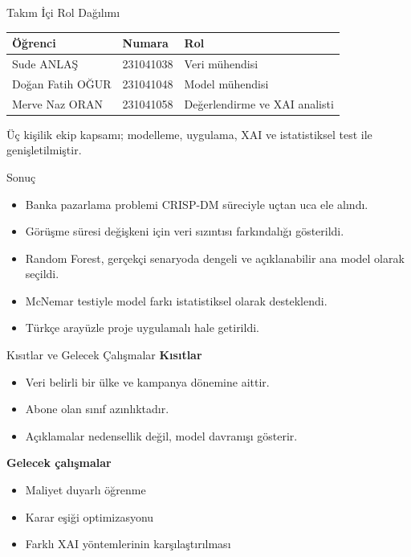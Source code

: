 \documentclass[aspectratio=169]{beamer}
\begin{document}
\begin{frame}{Takım İçi Rol Dağılımı}
    \centering
    \small
    \begin{tabular}{lll}
        \toprule
        \textbf{Öğrenci} & \textbf{Numara} & \textbf{Rol} \\
        \midrule
        Sude ANLAŞ & 231041038 & Veri mühendisi \\
        Doğan Fatih OĞUR & 231041048 & Model mühendisi \\
        Merve Naz ORAN & 231041058 & Değerlendirme ve XAI analisti \\
        \bottomrule
    \end{tabular}

    \vspace{0.35cm}
    \small Üç kişilik ekip kapsamı; modelleme, uygulama, XAI ve istatistiksel test ile genişletilmiştir.
\end{frame}

\begin{frame}{Sonuç}
    \begin{itemize}
        \item Banka pazarlama problemi CRISP-DM süreciyle uçtan uca ele alındı.
        \item Görüşme süresi değişkeni için veri sızıntısı farkındalığı gösterildi.
        \item Random Forest, gerçekçi senaryoda dengeli ve açıklanabilir ana model olarak seçildi.
        \item McNemar testiyle model farkı istatistiksel olarak desteklendi.
        \item Türkçe arayüzle proje uygulamalı hale getirildi.
    \end{itemize}
\end{frame}

\begin{frame}{Kısıtlar ve Gelecek Çalışmalar}
    \textbf{Kısıtlar}
    \begin{itemize}
        \item Veri belirli bir ülke ve kampanya dönemine aittir.
        \item Abone olan sınıf azınlıktadır.
        \item Açıklamalar nedensellik değil, model davranışı gösterir.
    \end{itemize}

    \textbf{Gelecek çalışmalar}
    \begin{itemize}
        \item Maliyet duyarlı öğrenme
        \item Karar eşiği optimizasyonu
        \item Farklı XAI yöntemlerinin karşılaştırılması
    \end{itemize}
\end{frame}
\end{document}
